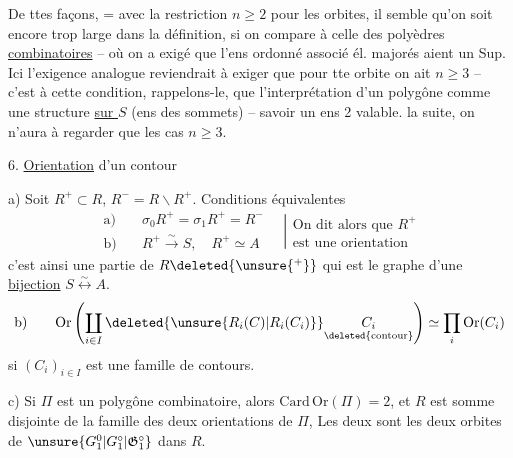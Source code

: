 De ttes façons, = avec la restriction $n\geq 2$
pour les orbites, il semble qu'on soit encore
trop large dans la définition, si on compare
à celle des polyèdres \uline{combinatoires} -- où
on a exigé que  l'ens ordonné associé
 él. majorés aient un Sup. Ici 
l'exigence analogue reviendrait à exiger que
pour tte orbite on ait $n\geq3$ -- c'est à cette
condition, rappelons-le, que l'interprétation
d'un polygône comme une structure
\uline{sur $S$} (ens des sommets) -- savoir
un ens  2  
valable.  la suite, on n'aura
à regarder que les cas $n\geq3$.

6. \uline{Orientation} d'un contour

a) Soit $R^+\subset R$,  $R^-=R\smallsetminus R^+$. Conditions
équivalentes
\[
\begin{aligned}
\text{a)}\quad&\sigma_0R^+=\sigma_1R^+=R^-\\
\text{b)}\quad&R^+\xrightarrow{\sim} S,\quad R^+\simeq A
\end{aligned}
\quad\left|\begin{gathered}\text{On dit alors que }R^+\\\text{est une orientation}\end{gathered}\right.
\]
c'est ainsi une partie  de $R\deleted{\unsure{{}^+}}$ qui est le graphe
d'une \uline{bijection} $S\overset{\sim}{\longleftrightarrow} A$.
\[
\text{b)}\qquad\mathrm{Or}\left(\coprod_{i\in I}\deleted{\unsure{R_i(C)|R_i(C_i)}}\underset{\deleted{\text{contour}}}{C_i}\right)\simeq\prod_i\mathrm{Or}(C_i)
\]
si $(C_i)_{i\in I}$ est une famille de contours.

c) Si $\Pi$ est un polygône combinatoire,
alors $\mathrm{Card}\,\mathrm{Or}(\Pi)=2$, et $R$ est  somme
disjointe de la famille des deux orientations
de $\Pi$,   Les deux 
sont les deux orbites de $\unsure{G_1^{0}|G_1^\circ|\mathfrak G_1^\circ}$ dans $R$.
